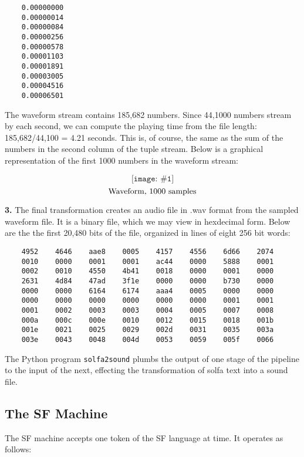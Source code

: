 \documentclass[11pt]{amsart}
\newcommand{\fig}[3]{  \[\texttt{[image: \#1]}\] \[\hbox{#3}\] }
\begin{document}
\begin{verbatim}
    0.00000000
    0.00000014
    0.00000084
    0.00000256
    0.00000578
    0.00001103
    0.00001891
    0.00003005
    0.00004516
    0.00006501
\end{verbatim}

The waveform stream contains 185,682 numbers.  Since 44,1000 numbers stream by
each second, we can compute the playing time from the file length: 185,682/44,100 = 4.21
seconds.  This is, of course, the same as the sum of the numbers in the second column of the tuple 
stream.  Below is a graphical representation of the first 1000 numbers in the waveform stream:


\fig{plot1000}{0.5}{Waveform, 1000 samples}



{\bf 3.} The final transformation creates an audio file in .wav format from the sampled waveform file.
It is a binary file, which we may view in hexdecimal form.  Below are the the first 20,480 bits
of the file, organized in lines of eight 256 bit words:

\begin{verbatim}
    4952    4646    aae8    0005    4157    4556    6d66    2074
    0010    0000    0001    0001    ac44    0000    5888    0001
    0002    0010    4550    4b41    0018    0000    0001    0000
    2631    4d84    47ad    3f1e    0000    0000    b730    0000
    0000    0000    6164    6174    aaa4    0005    0000    0000
    0000    0000    0000    0000    0000    0000    0001    0001
    0001    0002    0003    0003    0004    0005    0007    0008
    000a    000c    000e    0010    0012    0015    0018    001b
    001e    0021    0025    0029    002d    0031    0035    003a
    003e    0043    0048    004d    0053    0059    005f    0066
\end{verbatim}


The Python program {\tt solfa2sound} plumbs the output of one stage of the pipeline to the input of the next, effecting the transformation of solfa text into a sound file.



\subsection{The SF Machine}

The SF machine accepts one token of the SF language at time. It operates as follows:
\end{document}
